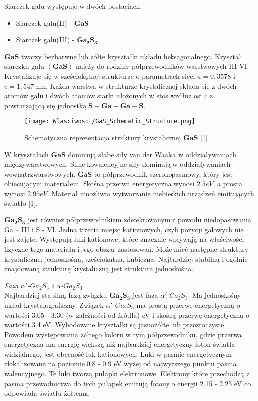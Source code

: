Siarczek galu występuje w dwóch postaciach:
\begin{itemize}
	\item Siarczek galu(II) - $\mathbf{GaS}$
	\item Siarczek galu(III) - $\mathbf{Ga_{2}S_{3}}$
\end{itemize}
$\mathbf{GaS}$ tworzy bezbarwne lub żółte kryształki układu heksagonalnego. Kryształ siarczku galu $\mathbf{(GaS)}$ należy do rodziny półprzewodników warstwowych III-VI. Krystalizuje się w sześciokątnej strukturze o parametrach sieci $a = 0,3578$ i $c = 1,547$ nm. Każda warstwa w strukturze krystalicznej składa się z dwóch atomów galu i dwóch atomów siarki ułożonych w stos wzdłuż osi $c$ z powtarzającą się jednostką $\mathbf{S-Ga-Ga-S}$.
\begin{figure}[H]
	\begin{center}
		\texttt{[image: Wlasciwosci/GaS\_Schematic\_Structure.png]}
		\caption{Schematyczna reprezentacja struktury krystalicznej $\mathbf{GaS}$ [1]}
	\end{center}
\end{figure}

W kryształach $\mathbf{GaS}$ dominują słabe siły van der Waalsa w oddziaływaniach międzywarstwowych. Silne kowalencyjne siły dominują w oddziaływaniach wewnątrzwarstwowych.
$\mathbf{GaS}$ to półprzewodnik szerokopasmowy, który jest obiecującym materiałem. Skośna przerwa energetyczna wynosi $2.5eV$, a prosta wynosi $2.95eV$. Materiał umożliwia
wytwarzanie niebieskich urządzeń emitujących światło [1].

$\mathbf{Ga_{2}S_{3}}$ jest również półprzewodnikiem zdefektowanym z powodu niedopasowania Ga – III i S - VI. Jedna trzecia miejsc kationowych, czyli pozycji galowych nie jest zajęte. Występują luki kationowe, które znacznie wpływają na właściwości fizyczne tego materiału i jego obszar zastosowań. Może mieć następne struktury krystaliczne: jednoskośna, sześciokątna, kubiczna. Najbardziej stabilną i ogólnie znajdowaną strukturę krystaliczną jest struktura jednoskośna.

\textit{Faza $\alpha'$-$Ga_{2}S_{3}$ i $\alpha$-$Ga_{2}S_{3}$} \\
Najbardziej stabilną fazą związku $\mathbf{Ga_{2}S_{3}}$ jest faza $\alpha'$-$Ga_{2}S_{3}$. Ma jednoskośny układ krystalograficzny. Związek $\alpha'$-$Ga_{2}S_{3}$ ma prostą przerwę energetyczną o wartości 3.05 - 3.30 (w zależności od źródła) eV i skośną przerwę energetyczną o wartości 3.4 eV. Wyhodowane kryształki są jasnożółte lub przezroczyste. Powodem występowania żółtego koloru w tym półprzewodniku, gdzie przerwa energetyczna ma energię większą niż najbardziej energetyczny foton światła widzialnego, jest obecność luk kationowych. Luki w pasmie energetycznym zlokalizowane na poziomie 0.8 - 0.9 eV wyżej od najwyższego punktu pasma walencyjnego. Te luki tworzą pułapki elektronowe. Elektrony które przechodzą z pasma przewodnictwa do tych pułapek emitują fotony o energii 2.15 - 2.25 eV co odpowiada światłu żółtemu.

